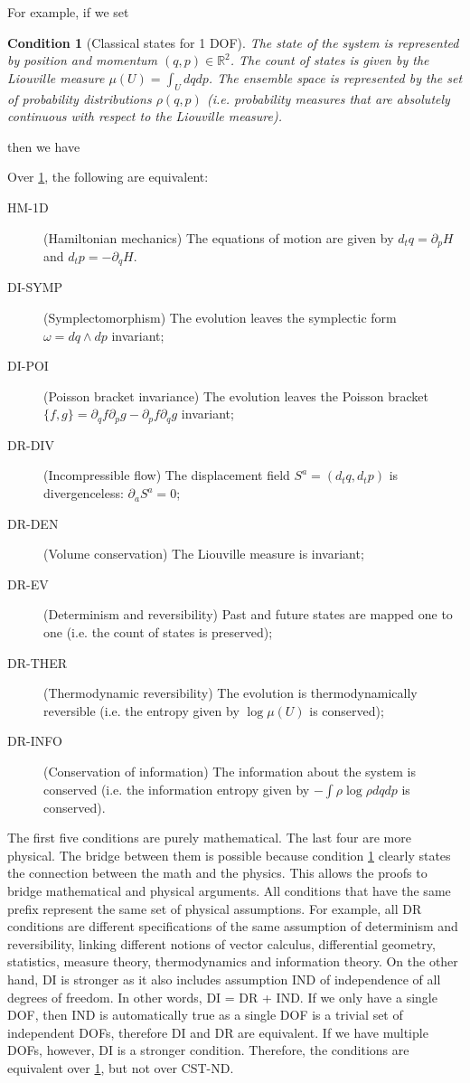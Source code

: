 \documentclass[entropy,article,submit,moreauthors]{Definitions/mdpi}
\newtheorem{condth}{Condition}
\renewcommand*{\thecondth}{\Roman{condth}}
\newenvironment{condition}[2][]{\renewcommand{\thecondth}{#2}\begin{condth}[#1]\label{#2}}{\end{condth}\renewcommand{\thecondth}{\Roman{condth}}}
\begin{document}
For example, if we set
\begin{condition}[Classical states for 1 DOF]{CST-1D}
	The state of the system is represented by position and momentum $(q,p) \in \mathbb{R}^2$. The count of states is given by the Liouville measure $\mu(U) = \int_U dq dp$. The ensemble space is represented by the set of probability distributions $\rho(q, p)$ (i.e. probability measures that are absolutely continuous with respect to the Liouville measure).
\end{condition}
then we have \cite{aop-book,aop-phil-Hamiltonianinformation}
\begin{Theorem}
	Over \ref{CST-1D}, the following are equivalent:
	\begin{description}
		\item[HM-1D] (Hamiltonian mechanics) The equations of motion are given by $d_t q = \partial_p H$ and $d_t p = - \partial_q H$.
		\item [DI-SYMP] (Symplectomorphism) The evolution leaves the symplectic form $\omega= dq \wedge dp$ invariant;
		\item [DI-POI] (Poisson bracket invariance) The evolution leaves the Poisson bracket $\{f,g\} = \partial_q f \partial_p g - \partial_p f \partial_q g$ invariant;
		\item [DR-DIV] (Incompressible flow) The displacement field $S^a = (d_t q, d_t p)$ is divergenceless: $\partial_a S^a = 0$;
		\item[DR-DEN] (Volume conservation) The Liouville measure is invariant;
		\item[DR-EV] (Determinism and reversibility) Past and future states are mapped one to one (i.e. the count of states is preserved);
		\item[DR-THER] (Thermodynamic reversibility) The evolution is thermodynamically reversible (i.e. the entropy given by $\log \mu(U)$ is conserved);
		\item[DR-INFO] (Conservation of information) The information about the system is conserved (i.e. the information entropy given by $- \int \rho \log \rho dq dp$ is conserved).
	\end{description}
\end{Theorem}
The first five conditions are purely mathematical. The last four are more physical. The bridge between them is possible because condition \ref{CST-1D} clearly states the connection between the math and the physics. This allows the proofs to bridge mathematical and physical arguments. All conditions that have the same prefix represent the same set of physical assumptions. For example, all DR conditions are different specifications of the same assumption of determinism and reversibility, linking different notions of vector calculus, differential geometry, statistics, measure theory, thermodynamics and information theory. On the other hand, DI is stronger as it also includes assumption IND of independence of all degrees of freedom. In other words, DI = DR + IND. If we only have a single DOF, then IND is automatically true as a single DOF is a trivial set of independent DOFs, therefore DI and DR are equivalent. If we have multiple DOFs, however, DI is a stronger condition. Therefore, the conditions are equivalent over \ref{CST-1D}, but not over CST-ND.
\end{document}
